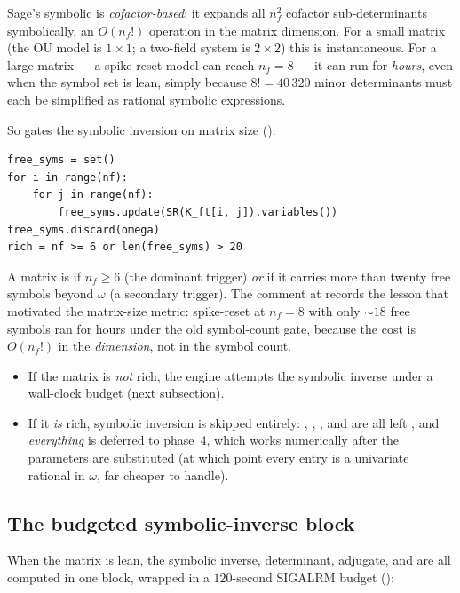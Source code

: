 Sage's symbolic  is \emph{cofactor-based}: it expands all
$n_f^2$ cofactor sub-determinants symbolically, an $O(n_f!)$ operation in the
matrix dimension. For a small matrix (the OU model is $1\times1$; a two-field
system is $2\times2$) this is instantaneous. For a large matrix --- a spike-reset
model can reach $n_f = 8$ --- it can run for \emph{hours}, even when the symbol set
is lean, simply because $8! = 40\,320$ minor determinants must each be simplified
as rational symbolic expressions.

So  gates the symbolic inversion on matrix size
():

\begin{lstlisting}
free_syms = set()
for i in range(nf):
    for j in range(nf):
        free_syms.update(SR(K_ft[i, j]).variables())
free_syms.discard(omega)
rich = nf >= 6 or len(free_syms) > 20
\end{lstlisting}

A matrix is  if $n_f \ge 6$ (the dominant trigger) \emph{or} if it
carries more than twenty free symbols beyond $\omega$ (a secondary trigger). The
comment at  records the lesson that motivated
the matrix-size metric: spike-reset at $n_f = 8$ with only $\sim18$ free symbols
ran for hours under the old symbol-count gate, because the cost is $O(n_f!)$ in
the \emph{dimension}, not in the symbol count.

\begin{itemize}
  \item If the matrix is \emph{not} rich, the engine attempts the symbolic inverse
        under a wall-clock budget (next subsection).
  \item If it \emph{is} rich, symbolic inversion is skipped entirely:
        , , , and  are all
        left , and \emph{everything} is deferred to phase~4, which
        works numerically after the parameters are substituted (at which point
        every entry is a univariate rational in $\omega$, far cheaper to handle).
\end{itemize}

\subsection{The budgeted symbolic-inverse block}

When the matrix is lean, the symbolic inverse, determinant, adjugate, and
 are all computed in one block, wrapped in a $120$-second SIGALRM
budget ():

